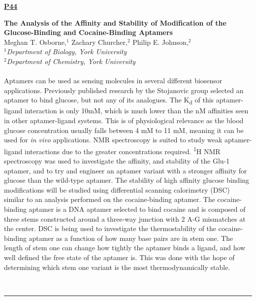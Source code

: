 \documentclass[titlepage,oneside,openany,10pt]{book}
\newenvironment{posterabs}[4] %
        {
	\begin{flushright}
                \underline{\textbf{#4}}
        \end{flushright}
        \textbf{#1}\\%
        #2\\%
        \textit{#3}\\\\%
        }
        {
        \\
        \noindent\rule{15cm}{0.5pt}%
        }
\begin{document}
\hspace{1cm}

\begin{posterabs}
    {The Analysis of the Affinity and Stability of Modification of the Glucose-Binding and Cocaine-Binding Aptamers}
    {Meghan T. Osborne,$^{1}$ Zachary Churcher,$^{2}$ Philip E. Johnson,$^{2}$}
    {
    $^1$Department of Biology, York University\\
    $^2$Department of Chemistry, York University
    }
    {P44}
    Aptamers can be used as sensing molecules in several different biosensor applications. Previously published research by the Stojanovic group selected an aptamer to bind glucose, but not any of its analogues. The K\textsubscript{d} of this aptamer-ligand interaction is only 10mM, which is much lower than the nM affinities seen in other aptamer-ligand systems. This is of physiological relevance as the blood glucose concentration usually falls between 4 mM to 11 mM, meaning it can be used for \emph{in vivo} applications. NMR spectroscopy is suited to study weak aptamer-ligand interactions due to the greater concentrations required. \textsuperscript{1}H NMR spectroscopy was used to investigate the affinity, and stability of the Glu-1 aptamer, and to try and engineer an aptamer variant with a stronger affinity for glucose than the wild-type aptamer. The stability of high affinity glucose binding modifications will be studied using differential scanning calorimetry (DSC) similar to an analysis performed on the cocaine-binding aptamer. The cocaine-binding aptamer is a DNA aptamer selected to bind cocaine and is composed of three stems constructed around a three-way junction with 2 A-G mismatches at the center. DSC is being used to investigate the thermostability of the cocaine-binding aptamer as a function of how many base pairs are in stem one. The length of stem one can change how tightly the aptamer binds a ligand, and how well defined the free state of the aptamer is. This was done with the hope of determining which stem one variant is the most thermodynamically stable.
    \label{OsborneM}
\end{posterabs}

\newpage
\end{document}
